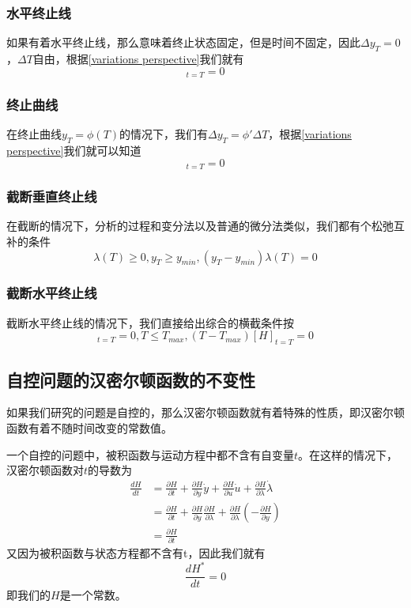 \documentclass[UTF8,12pt]{ctexart}
\numberwithin{equation}{section} %
\numberwithin{figure}{section}
\numberwithin{table}{section}
\begin{document}
	\subsubsection{水平终止线}
	如果有着水平终止线，那么意味着终止状态固定，但是时间不固定，因此$\Delta y_T = 0$，$\Delta T$自由，根据\ref{variations perspective}我们就有
	\begin{equation}
		[H]_{t = T} = 0
	\end{equation}
	
	\subsubsection{终止曲线}
	在终止曲线$y_T = \phi(T)$的情况下，我们有$\Delta y_T = \phi' \Delta T$，根据\ref{variations perspective}我们就可以知道
	\begin{equation}
		[H - \lambda\phi']_{t = T} = 0
	\end{equation}

	\subsubsection{截断垂直终止线}
	在截断的情况下，分析的过程和变分法以及普通的微分法类似，我们都有个松弛互补的条件
	\begin{equation}
		\lambda(T) \geqslant 0,y_T \geqslant y_{min},(y_T - y_{min})\lambda(T) = 0
	\end{equation}
	
	\subsubsection{截断水平终止线}
	截断水平终止线的情况下，我们直接给出综合的横截条件按
	\begin{equation}
		[H]_{t = T} = 0,T \leqslant T_{max},(T - T_{max})[H]_{t = T} = 0
	\end{equation}
	
	\subsection{自控问题的汉密尔顿函数的不变性}
	如果我们研究的问题是自控的，那么汉密尔顿函数就有着特殊的性质，即汉密尔顿函数有着不随时间改变的常数值。
	
	一个自控的问题中，被积函数与运动方程中都不含有自变量$t$。在这样的情况下，汉密尔顿函数对$t$的导数为
	\begin{equation}
		\begin{aligned}
			\frac{d H}{d t} &= \frac{\partial H}{\partial t} + \frac{\partial H}{\partial y}\dot{y} + \frac{\partial H}{\partial u}\dot{u} + \frac{\partial H}{\partial \lambda} \dot{\lambda} \\
			&=\frac{\partial H}{\partial t} + \frac{\partial H}{\partial y}\frac{\partial H}{\partial \lambda}  + \frac{\partial H}{\partial \lambda} (-\frac{\partial H}{\partial y}) \\
			&=\frac{\partial H}{\partial t}
		\end{aligned}
	\end{equation}
	又因为被积函数与状态方程都不含有t，因此我们就有
	\begin{equation}
		\frac{dH^*}{dt} = 0
	\end{equation}
	即我们的$H$是一个常数。
	
\end{document}
